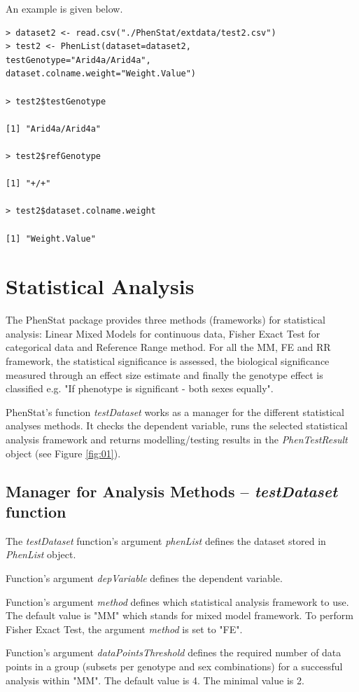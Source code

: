 \documentclass[12pt,a4paper]{article}
\begin{document}
An example is given below.
\begingroup
    \fontsize{8pt}{12pt}\selectfont
\begin{verbatim}
> dataset2 <- read.csv("./PhenStat/extdata/test2.csv")
> test2 <- PhenList(dataset=dataset2,
testGenotype="Arid4a/Arid4a",
dataset.colname.weight="Weight.Value")

> test2$testGenotype

[1] "Arid4a/Arid4a"

> test2$refGenotype

[1] "+/+"

> test2$dataset.colname.weight

[1] "Weight.Value"
\end{verbatim}
\endgroup

\section{Statistical Analysis}
The PhenStat package provides three methods (frameworks) for statistical analysis: Linear Mixed Models for continuous data, Fisher Exact Test for categorical data and Reference Range method. For all the MM, FE and RR framework, 
the statistical significance is assessed, the biological significance measured through an effect size estimate and finally the genotype effect is classified e.g. "If phenotype is significant - both sexes equally".  


PhenStat's function \textit{testDataset} works as a manager for the different statistical analyses methods. It checks the dependent variable, runs the selected statistical analysis framework and
 returns modelling\slash testing results in the \textit{PhenTestResult} object (see Figure \ref{fig:01}). 

\subsection{Manager for Analysis Methods -- \textit{testDataset} function}
The \textit{testDataset} function's argument \textit{phenList} defines the dataset stored in \textit{PhenList} object.

Function's argument \textit{depVariable} defines the dependent variable.

Function's argument \textit{method} defines which statistical analysis framework to use. 
The default value is "MM" which stands for mixed model framework. To perform Fisher Exact Test, the argument \textit{method} is set to "FE". 

Function's argument \textit{dataPointsThreshold} defines the required number of data points in a group (subsets per genotype and sex combinations) for a successful analysis within "MM". The default value is 4. The minimal value is 2.
\end{document}
